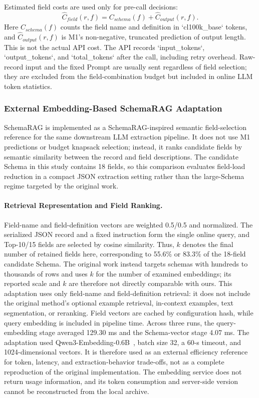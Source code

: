 \documentclass[runningheads]{llncs}
\newcommand{\method}{M1}
\newcommand{\schemarag}{SchemaRAG}
\begin{document}
Estimated field costs are used only for pre-call decisions:
\begin{equation}
 \widehat{C}_{field}(r,f)=C_{schema}(f)+\widehat{C}_{output}(r,f).
\end{equation}
Here $C_{schema}(f)$ counts the field name and definition in `cl100k_base` tokens, and $\widehat{C}_{output}(r,f)$ is \method{}'s non-negative, truncated prediction of output length. This is not the actual API cost. The API records `input_tokens`, `output_tokens`, and `total_tokens` after the call, including retry overhead. Raw-record input and the fixed Prompt are usually sent regardless of field selection; they are excluded from the field-combination budget but included in online LLM token statistics.

\subsubsection{External Embedding-Based SchemaRAG Adaptation}

\schemarag{} is implemented as a SchemaRAG-inspired semantic field-selection reference for the same downstream LLM extraction pipeline. It does not use \method{} predictions or budget knapsack selection; instead, it ranks candidate fields by semantic similarity between the record and field descriptions. The candidate Schema in this study contains 18 fields, so this comparison evaluates field-load reduction in a compact JSON extraction setting rather than the large-Schema regime targeted by the original work.

\paragraph{Retrieval Representation and Field Ranking.}

Field-name and field-definition vectors are weighted 0.5/0.5 and normalized. The serialized JSON record and a fixed instruction form the single online query, and Top-10/15 fields are selected by cosine similarity. Thus, $k$ denotes the final number of retained fields here, corresponding to 55.6\% or 83.3\% of the 18-field candidate Schema. The original work instead targets schemas with hundreds to thousands of rows and uses $k$ for the number of examined embeddings; its reported scale and $k$ are therefore not directly comparable with ours. This adaptation uses only field-name and field-definition retrieval: it does not include the original method's optional example retrieval, in-context examples, text segmentation, or reranking. Field vectors are cached by configuration hash, while query embedding is included in pipeline time. Across three runs, the query-embedding stage averaged 129.30 ms and the Schema-vector stage 4.07 ms. The adaptation used Qwen3-Embedding-0.6B~\cite{zhang2025qwen3embedding}, batch size 32, a 60-s timeout, and 1024-dimensional vectors. It is therefore used as an external efficiency reference for token, latency, and extraction-behavior trade-offs, not as a complete reproduction of the original implementation. The embedding service does not return usage information, and its token consumption and server-side version cannot be reconstructed from the local archive.
\end{document}
